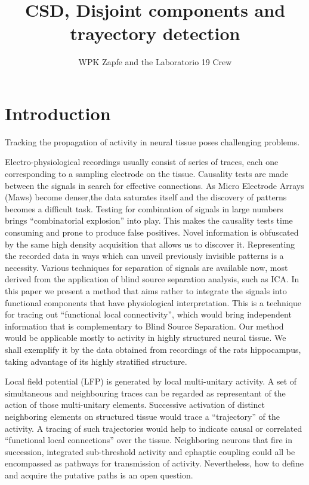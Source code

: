 \documentclass[11pt, letterpaper]{article}
\author{WPK Zapfe and the Laboratorio 19 Crew}
\title{CSD, Disjoint components and trayectory detection}
\begin{document}
\maketitle

\section{Introduction}

Tracking the propagation of activity in neural tissue poses challenging
problems. 

Electro-physiological recordings usually consist of 
 series of traces, each one corresponding to a sampling
electrode on the tissue. Causality tests are made between the
signals in search for effective connections. 
As Micro Electrode Arrays (Maws) become denser,the data saturates itself
and the discovery of patterns becomes a difficult task.
Testing for combination of signals in large numbers
brings ``combinatorial explosion'' into
play. This makes the causality tests time consuming and
prone to produce false positives.
Novel information is obfuscated by the same high density acquisition that allows us to
discover it. Representing  the recorded data in ways which can unveil previously
invisible patterns is a necessity. Various techniques for separation of signals
are available now, most derived from the application of blind source
separation analysis, such as ICA.
In this paper we present a method that aims rather to integrate
the signals into functional components that
have physiological interpretation.
This is a technique for tracing out
``functional local connectivity'', which would bring independent information
that is complementary to Blind Source Separation.
Our  method would be applicable mostly to
activity in highly structured neural tissue. We shall exemplify it by
the data obtained from recordings of the rats hippocampus,
taking advantage of its highly stratified  structure. 

Local field potential (LFP)
is generated by local multi-unitary activity.
A set of simultaneous and neighbouring traces
can be regarded as representant of the action
of those multi-unitary elements. 
Successive activation  of distinct neighboring elements on structured
tissue would trace a
``trajectory'' of the activity. A tracing of such trajectories would help to indicate
causal or correlated ``functional local connections'' over the tissue. Neighboring
neurons that fire in succession, integrated sub-threshold activity and ephaptic coupling
could all be encompassed as pathways for transmission of activity. Nevertheless,
how to define and acquire the putative paths is an open question.
\end{document}
